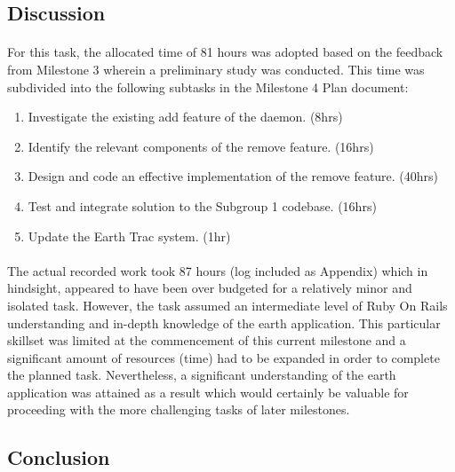 \documentclass[10pt,a4,oneside]{article}
\begin{document}
\newpage

\subsection*{Discussion}

\paragraph{}
For this task, the allocated time of 81 hours was adopted based 
on the feedback from Milestone 3 wherein a preliminary study was 
conducted. This time was subdivided into the following subtasks in 
the Milestone 4 Plan document:

\begin{enumerate}
\item Investigate the existing add feature of the daemon. (8hrs)
\item Identify the relevant components of the remove feature. (16hrs)
\item Design and code an effective implementation of the remove feature. (40hrs)
\item Test and integrate solution to the Subgroup 1 codebase. (16hrs)
\item Update the Earth Trac system. (1hr)
\end{enumerate}

\paragraph{}
The actual recorded work took 87 hours (log included as Appendix) which in 
hindsight, appeared to have been over budgeted for a relatively minor and 
isolated task. However, the task assumed an intermediate level of Ruby On Rails 
understanding and in-depth knowledge of the earth application. 
This particular skillset was limited at the commencement of this current 
milestone and a significant amount of resources (time) had to be expanded 
in order to complete the planned task. Nevertheless, a significant 
understanding of the earth application was attained as a result which 
would certainly be valuable for proceeding with the more challenging 
tasks of later milestones.

\paragraph{}

\subsection*{Conclusion}
\end{document}
